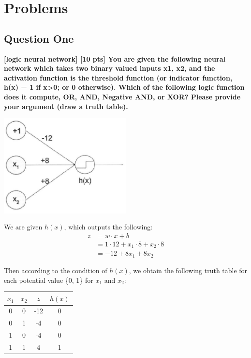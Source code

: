 \section{Problems}

\subsection{Question One}
\textbf{[logic neural network] [10 pts] You are given the following neural network which takes two binary valued inputs x1, x2, and the activation function is the threshold function (or indicator function, h(x) = 1 if x>0; or 0 otherwise). Which of the following logic function does it compute, OR, AND, Negative AND, or XOR? Please provide your argument (draw a truth table).}

\includegraphics[width=0.5\textwidth]{media/hw7_q1.png}

We are given $h(x)$, which outputs the following:
\begin{align}
    z &= w \cdot x + b \label{eq:q1_1} \nonumber \\
    &= 1\cdot 12 + x_1 \cdot 8 + x_2 \cdot 8 \nonumber \\
    &= -12 + 8x_1 + 8x_2
\end{align}

Then according to the condition of $h(x)$, we obtain the following truth table for each potential value \{0, 1\} for $x_1$ and $x_2$:

\begin{table}[h!]
  \centering
  \begin{tabular}{|c|c|c|c|}
  \hline
  \(x_1\) & \(x_2\) & \(z\) & \(h(x)\) \\ \hline
  0       & 0       &  -12     &   0       \\ \hline
  0       & 1       &   -4    &    0      \\ \hline
  1       & 0       &   -4    &    0      \\ \hline
  1       & 1       &    4   &     1     \\ \hline
  \end{tabular}
  \end{table}

